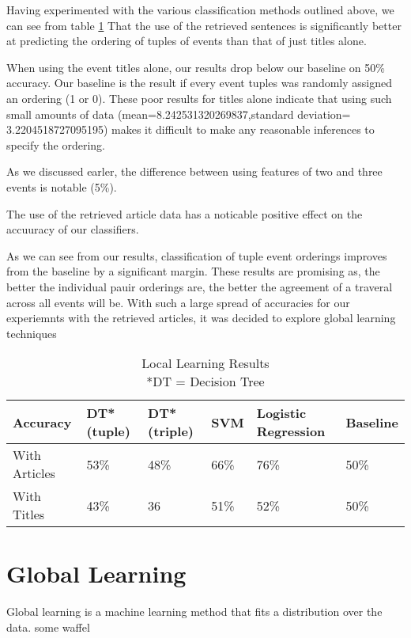 \documentclass[bsc,frontabs,twoside,singlespacing,parskip,deptreport]{infthesis}     %
\begin{document}
Having experimented with the various classification methods outlined above, we can see from table \ref{table:local-learning}
That the use of the retrieved sentences is significantly better at predicting the ordering of tuples of events than that of
just titles alone.

When using the event titles alone, our results drop below our baseline on 50\% accuracy.
Our baseline is the result if every event tuples was randomly assigned an ordering (1 or 0).
These poor results for titles alone indicate that using such small amounts of data
(mean=8.242531320269837,standard deviation= 3.2204518727095195) makes it difficult to make any reasonable inferences to specify the ordering.


As we discussed earler, the difference between using features of two and three events is notable (5\%).

The use of the retrieved article data has a noticable positive effect on the accuuracy of our classifiers.



As we can see from our results, classification of tuple event orderings improves from the baseline by a significant margin.
These results are promising as, the better the individual pauir orderings are, the better the agreement of a traveral across all events will be.
With such a large spread of accuracies for our experiemnts with the retrieved articles, it was decided to explore global learning techniques

\begin{table}[H]
\centering
\label{table:local-learning}
\begin{tabular}{|p{5em}|l|l|l|p{4em}|l|}
  \hline
  Accuracy  & DT* (tuple) & DT* (triple) & SVM & Logistic Regression & Baseline\\
  \hline
  With Articles    & 53\%  & 48\%    & 66\% &  76\% & 50\%\\
\hline
With Titles & 43\%  & 36& 51\%    & 52\% & 50\%\\
\hline
\end{tabular}
\caption{Local Learning Results  \\*DT = Decision Tree }
\end{table}


\section{Global Learning}
Global learning is a machine learning method that fits a distribution over the data.
some waffel \cite{huang2008machine}
\end{document}
